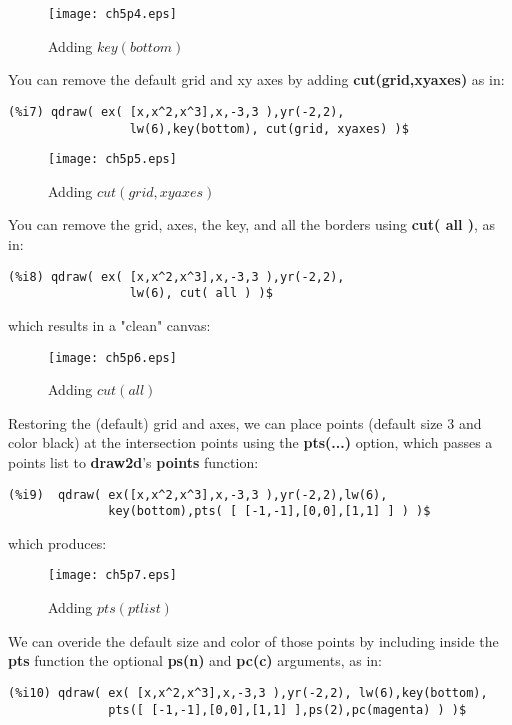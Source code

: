 \documentclass[12pt]{article}
\begin{document}
\begin{figure} [h]
   \centerline{\texttt{[image: ch5p4.eps]} }
	\caption{ Adding $key(bottom)$ }
\end{figure}    

You can remove the default grid and xy axes by adding \textbf{cut(grid,xyaxes)}
as in:
\small
\begin{verbatim}
(%i7) qdraw( ex( [x,x^2,x^3],x,-3,3 ),yr(-2,2),
                 lw(6),key(bottom), cut(grid, xyaxes) )$
\end{verbatim}
\normalsize

\begin{figure} [h]
   \centerline{\texttt{[image: ch5p5.eps]} }
	\caption{ Adding $cut(grid, xyaxes)$ }
\end{figure}    
\newpage
You can remove the grid, axes, the key, and all the borders using \textbf{cut( all )},
  as in:
\small
\begin{verbatim}
(%i8) qdraw( ex( [x,x^2,x^3],x,-3,3 ),yr(-2,2),
                 lw(6), cut( all ) )$
\end{verbatim}
\normalsize
which results in a "clean" canvas:
\begin{figure} [h]
   \centerline{\texttt{[image: ch5p6.eps]} }
	\caption{ Adding $cut( all )$ }
\end{figure}
\smallskip
    
Restoring the (default) grid and axes, we can place points (default size 3 and color black)
  at the intersection points using the \textbf{pts(...)} option, which passes
  a points list to \textbf{draw2d}'s \textbf{points} function:
\small
\begin{verbatim}
(%i9)  qdraw( ex([x,x^2,x^3],x,-3,3 ),yr(-2,2),lw(6),
              key(bottom),pts( [ [-1,-1],[0,0],[1,1] ] ) )$
\end{verbatim}
\normalsize
which produces:
\begin{figure} [h]
   \centerline{\texttt{[image: ch5p7.eps]} }
	\caption{ Adding $pts( ptlist )$ }
\end{figure}    
\newpage
We can overide the default size and color of those points by including inside
  the \textbf{pts} function the optional \textbf{ps(n)} and \textbf{pc(c)} 
  arguments, as in:
\small
\begin{verbatim}
(%i10) qdraw( ex( [x,x^2,x^3],x,-3,3 ),yr(-2,2), lw(6),key(bottom), 
              pts([ [-1,-1],[0,0],[1,1] ],ps(2),pc(magenta) ) )$
\end{verbatim}
\normalsize
\end{document}

